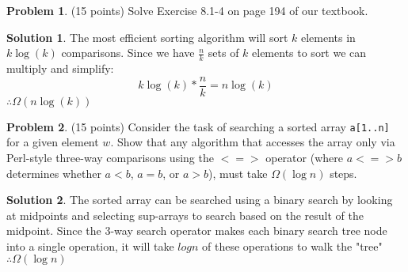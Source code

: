\documentclass{article}
\theoremstyle{definition}
\newtheorem{problem}{Problem}
\newtheorem*{solution}{Solution}
\begin{document}
\begin{problem}(15 points) 
Solve Exercise 8.1-4 on page 194 of our textbook.
\begin{solution}
The most efficient sorting algorithm will sort $k$ elements in $k\log(k)$ comparisons. Since we have $\frac{n}{k}$ sets of $k$ elements to sort we can multiply and simplify:
$$k\log(k) * \frac{n}{k} = n\log(k)$$
$\therefore \Omega(n\log(k))$
\end{solution}
\end{problem}

\begin{problem} (15 points) Consider the task of searching a sorted
  array \verb|a[1..n]| for a given element $w$. Show that any
  algorithm that accesses the array only via Perl-style three-way
  comparisons using the $<=>$ operator (where $a <=> b$ determines
  whether $a<b$, $a=b$, or $a>b$), must take $\Omega(\log n)$ steps.
\end{problem}
\begin{solution}
The sorted array can be searched using a binary search by looking at midpoints and selecting sup-arrays to search based on the result of the midpoint. Since the 3-way search operator makes each binary search tree node into a single operation, it will take $log n$ of these operations to walk the "tree" $\therefore \Omega(\log n)$
\end{solution}
\end{document}

